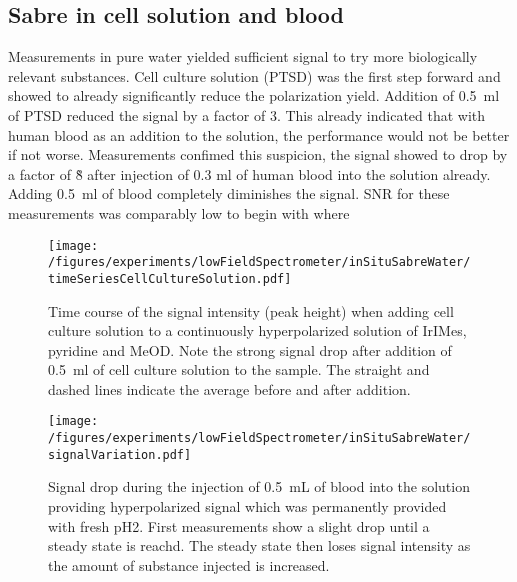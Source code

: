     \subsection{Sabre in cell solution and blood}
        Measurements in pure water yielded sufficient signal to try more biologically relevant substances. Cell culture solution (PTSD) was the first step forward and showed to already significantly reduce the polarization yield. Addition of \SI{0.5}{\milli\litre} of PTSD reduced the signal by a factor of 3. This already indicated that with human blood as an addition to the solution, the performance would not be better if not worse. Measurements confimed this suspicion, the signal showed to drop by a factor of \~8 after injection of 0.3 ml of human blood into the solution already. Adding \SI{0.5}{\milli\litre} of blood completely diminishes the signal. SNR for these measurements was comparably low to begin with where
        \begin{figure}
            \texttt{[image: /figures/experiments/lowFieldSpectrometer/inSituSabreWater/timeSeriesCellCultureSolution.pdf]}
            \caption[Cell culture solution addition to hyperpolarized signal]{Time course of the signal intensity (peak height) when adding cell culture solution to a continuously hyperpolarized solution of IrIMes, pyridine and MeOD. Note the strong signal drop after addition of \SI{0.5}{\milli\litre} of cell culture solution to the sample. The straight and dashed lines indicate the average before and after addition.}
            \label{chap:MaterialsAndMethods:bloodInjection}
        \end{figure}
        \begin{figure}
            \centering
            \texttt{[image: /figures/experiments/lowFieldSpectrometer/inSituSabreWater/signalVariation.pdf]}
            \label{chap:MaterialsAndMethods:bloodInjection2}
            \caption[Blood addition to hyperpolarized signal]{Signal drop during the injection of \SI{0.5}{\milli\liter} of blood into the solution providing hyperpolarized signal which was permanently provided with fresh pH2. First measurements show a slight drop until a steady state is reachd. The steady state then loses signal intensity as the amount of substance injected is increased.}
        \end{figure}
